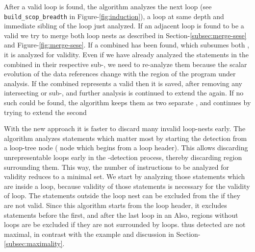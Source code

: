 \documentclass{sig-alternate}
\begin{document}
After a valid loop is found, the algorithm analyzes the next loop (see
\texttt{build\_scop\_breadth} in Figure-\ref{fig:induction}), a loop at same
depth and immediate sibling of the loop just analyzed.  If an adjacent loop is
found to be a valid \SCoP{,} we try to merge both loop nests as described in
Section-\ref{subsec:merge-sese} and Figure-\ref{fig:merge-sese}.  If a combined
\SESE{} has been found, which subsumes both , it is analyzed for
validity. Even if we have already analyzed the statements in the combined
\SESE{} in their respective sub-, we need to re-analyze them because the
scalar evolution of the data references change with the region of the program
under analysis. If the combined \SESE{} represents a valid \SCoP{,} then it is
saved, after removing any intersecting or sub-, and further analysis is
continued to extend the \SCoP{} again.  If no such \SESE{} could be found, the
algorithm keeps them as two separate , and continues by trying to extend
the second 

With the new approach it is faster to discard many invalid loop-nests early. The
algorithm analyzes statements which matter most by starting the \SCoP{} detection
from a loop-tree node (\CFG{} node which begins from a loop header). This allows
discarding unrepresentable loops early in the \SCoP{}-detection process, thereby
discarding \SESE{} region surrounding them.  This way, the number of instructions
to be analyzed for validity reduces to a minimal set.  We start by analyzing
those statements which are inside a loop, because validity of those statements
is necessary for the validity of loop.  The statements outside the loop nest can
be excluded from the \SESE{} if they are not valid.  Since this algorithm starts
from the loop header, it excludes statements before the first, and after
the last loop in an   Also, regions without loops are be excluded if they
are not surrounded by loops.   thus detected are not maximal, in contrast
with the example and discussion in Section-\ref{subsec:maximality}.
\end{document}

